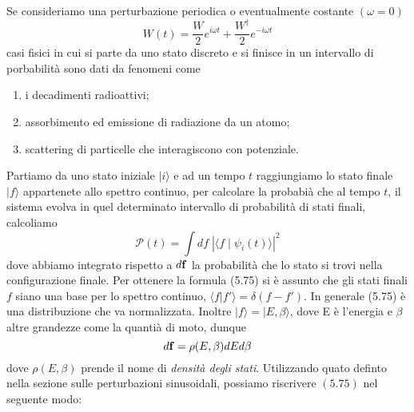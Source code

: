 Se consideriamo una perturbazione periodica o eventualmente costante $(\omega = 0)$
\begin{equation*}
	W(t) = \frac{W}{2}e^{i \omega t} + \frac{W^\dag}{2}e^{-i\omega t}
\end{equation*}
casi fisici in cui si parte da uno stato discreto e si finisce in un intervallo di porbabilit\`a sono dati da fenomeni come
\begin{enumerate}
	\item i decadimenti radioattivi;
	\item assorbimento ed emissione di radiazione da un atomo;
	\item scattering di particelle che interagiscono con potenziale.  
\end{enumerate}
Partiamo da uno stato iniziale $|i \rangle$ e ad un tempo $t$ raggiungiamo lo stato finale $|f \rangle$ appartenete allo spettro continuo, per calcolare la probabi\`a che al tempo $t$, il sistema evolva in quel determinato intervallo di probabilit\`a di stati finali, calcoliamo
\begin{equation}
	\mathcal{P}(t) = \int df \; |\langle f \mid \psi_i(t) \rangle|^2
\end{equation}
dove abbiamo integrato rispetto a $d \bold{f}$ la probabilit\`a che lo stato si trovi nella configurazione finale. Per ottenere la formula (5.75) si \`e assunto che gli stati finali $f$ siano una base per lo spettro continuo, $\langle f|f' \rangle = \delta(f - f')$. In generale (5.75) \`e una distribuzione che va normalizzata. Inoltre $|f \rangle =|E,\beta \rangle $, dove E \`e l'energia e $\beta$ altre grandezze come la quanti\`a di moto, dunque 
\begin{equation*}
	d\bold{f} = \rho(E,\beta) dE d\beta 	
\end{equation*}
dove $\rho(E,\beta)$ prende il nome di \textit{densit\`a degli stati}. Utilizzando quato definto nella sezione sulle perturbazioni sinusoidali, possiamo riscrivere $(5.75)$ nel seguente modo:
\newpage


